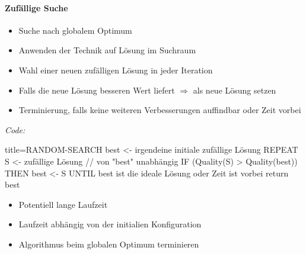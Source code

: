 \documentclass[
    ngerman,
    color=3b,
    dark_mode,
    load_common, %
    summary,
    boxarc,
]{tuda_summary}
\begin{document}
\paragraph{Zufällige Suche}\mbox{}
\begin{idea}\mbox{}
    \begin{itemize}
        \item Suche nach globalem Optimum
        \item Anwenden der Technik auf  Lösung im Suchraum
        \item Wahl einer neuen zufälligen Lösung in jeder Iteration
        \item Falls die neue Lösung besseren Wert liefert $\Rightarrow$ als neue  Lösung setzen
        \item Terminierung, falls keine weiteren Verbesserungen auffindbar oder Zeit vorbei
    \end{itemize}
\end{idea}
\textit{Code:}

\begin{codeBlock}[autogobble]{title={RANDOM-SEARCH}}
best <- irgendeine initiale zufällige Lösung
REPEAT
    S <- zufällige Lösung // von "best" unabhängig
    IF (Quality(S) > Quality(best)) THEN
        best <- S
UNTIL best ist die ideale Lösung oder Zeit ist vorbei
return best
\end{codeBlock}
\begin{description}[leftmargin=2cm,itemsep=.8em]
    \item[Nachteile] \begin{itemize}
              \item Potentiell lange Laufzeit
              \item Laufzeit abhängig von der initialien Konfiguration
          \end{itemize}
    \item[Vorteile] \begin{itemize}
              \item Algorithmus  beim globalen Optimum terminieren
          \end{itemize}
\end{description}

\clearpage
\end{document}
